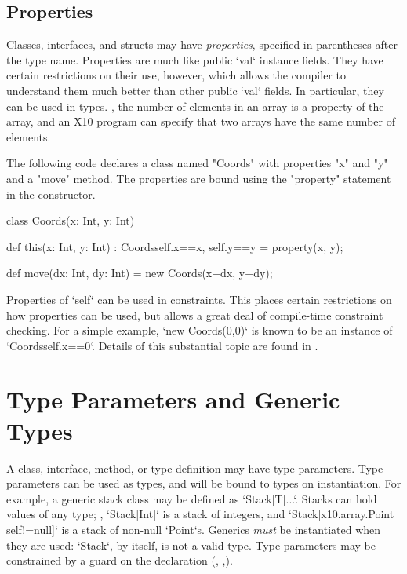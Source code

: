 \subsection{Properties}
\label{properties}

Classes, interfaces, and structs may have {\em properties}, specified in
parentheses after the type name. Properties are much like public \xcd`val`
instance fields. They have certain restrictions on their use, however, which
allows the compiler to understand them much better than other public \xcd`val`
fields. In particular, they can be used in types.  \Eg, the number of elements
in an array is a property of the array, and an X10 program can specify that
two arrays have the same number of elements.

\begin{ex}
The
following code declares a class named \xcd"Coords" with properties
\xcd"x" and \xcd"y" and a \xcd"move" method. The properties are bound
using the \xcd"property" statement in the constructor.

\begin{xten}
class Coords(x: Int, y: Int) { 
  def this(x: Int, y: Int) :
    Coords{self.x==x, self.y==y} = { 
    property(x, y); 
  } 

  def move(dx: Int, dy: Int) = new Coords(x+dx, y+dy); 
}
\end{xten}
\end{ex}

Properties of \xcd`self` can be used in constraints.  This places certain
restrictions on how properties can be used, but allows a great deal of
compile-time constraint checking.  For a simple example, 
\xcd`new Coords(0,0)` is known to be an instance of \xcd`Coords{self.x==0}`.  
Details of this substantial topic are
found in .



\section{Type Parameters and Generic Types}
\label{TypeParameters}

\label{Generics}

A class, interface, method, or type definition  may have type
parameters.  Type parameters can be used as types, and will be bound to types
on instantiation.  
For example, a generic stack class may be defined as 
\xcd`Stack[T]{...}`.  Stacks can hold values of any type; \eg, 
\xcd`Stack[Int]` is a stack of integers, and 
\xcd`Stack[x10.array.Point {self!=null}]` is a stack of non-null \xcd`Point`s.
Generics {\em must} be instantiated when they are used: \xcd`Stack`, by
itself, is not a valid type.
Type parameters may be constrained by a guard on the declaration
(,
,).

